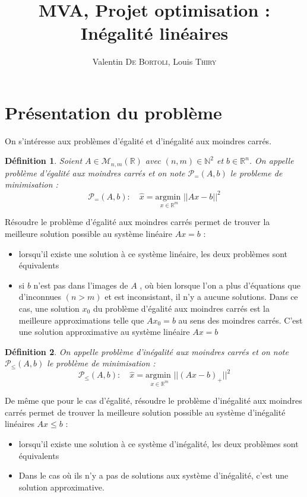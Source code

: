 \documentclass[10pt,a4paper]{article}
\title{MVA, Projet optimisation : Inégalité linéaires}
\author{Valentin \textsc{De Bortoli}, Louis \textsc{Thiry}}
\newtheorem{mydef}{Définition}
\begin{document}
\maketitle
\tableofcontents

\section{Présentation du problème}

On s'intéresse aux problèmes d'égalité et d'inégalité aux moindres carrés.

\begin{mydef}
  Soient $A \in \mathcal{M}_{n,m}(\mathbb{R})$ avec $(n,m) \in \mathbb{N}^2$ et $b \in \mathbb{R}^{n}$.
    On appelle problème d'égalité aux moindres carrés et on note $\mathcal{P}_{=} (A, b)$ le probleme de minimisation :
    \begin{equation}
    \label{pbm1}
      \mathcal{P}_{=}(A, b): \quad \hat{x} = \underset{x \in \mathbb{R}^m}{\text{argmin }}  ||Ax - b||^{2}
    \end{equation}
\end{mydef}
Résoudre le problème d'égalité aux moindres carrés permet de trouver la meilleure solution possible au système linéaire $Ax = b$ :
\begin{itemize}
  \item lorsqu'il existe une solution à ce système linéaire, les deux problèmes sont équivalents
  \item si $b$ n'est pas dans l'images de $A$ , où bien lorsque l'on a plus d'équations que d'inconnues $(n > m)$ et est inconsistant, il n'y a aucune solutions.
    Dans ce cas, une solution $x_0$ du problème d'égalité aux moindres carrés est la meilleure approximations telle que $Ax_0 = b$ au sens des moindres carrés.
    C'est une solution approximative au système linéaire $Ax = b$
\end{itemize}

\begin{mydef}
  On appelle problème d'inégalité aux moindres carrés et on note $\mathcal{P}_{\leq} (A, b)$ le problème de minimisation :
    \begin{equation}
    \label{pbm2}
      \mathcal{P}_{\leq} (A, b): \quad \hat{x} = \underset{x \in \mathbb{R}^m}{\text{argmin }}  ||(Ax - b)_+||^{2}
    \end{equation}
\end{mydef}
De même que pour le cas d'égalité, résoudre le problème d'inégalité aux moindres carrés permet de trouver la meilleure solution possible au système d'inégalité linéaires $Ax \leq b$ :
\begin{itemize}
  \item lorsqu'il existe une solution à ce système d'inégalité, les deux problèmes sont équivalents
  \item Dans le cas où ils n'y a pas de solutions aux système d'inégalité, c'est une solution approximative.
\end{itemize}
\end{document}
